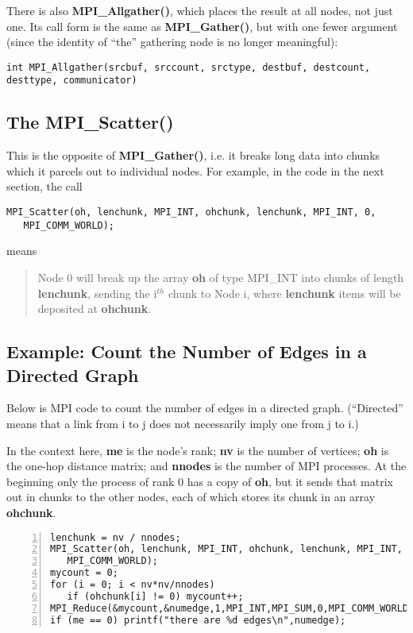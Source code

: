 There is also {\bf MPI\_Allgather()}, which places the result at all
nodes, not just one.  Its call form is the same as {\bf MPI\_Gather()},
but with one fewer argument (since the identity of ``the'' gathering
node is no longer meaningful):

\begin{lstlisting}
int MPI_Allgather(srcbuf, srccount, srctype, destbuf, destcount, desttype, communicator)
\end{lstlisting}

\subsection{The MPI\_Scatter()}

This is the opposite of {\bf MPI\_Gather()}, i.e. it breaks long data
into chunks which it parcels out to individual nodes.  For example,
in the code in the next section, the call

\begin{lstlisting}
MPI_Scatter(oh, lenchunk, MPI_INT, ohchunk, lenchunk, MPI_INT, 0,
   MPI_COMM_WORLD);
\end{lstlisting} 

means

\begin{quote}
Node 0 will break up the array {\bf oh} of type MPI\_INT into chunks 
of length {\bf lenchunk}, sending the i$^{th}$ chunk to Node i, where
{\bf lenchunk} items will be deposited at {\bf ohchunk}.
\end{quote}

\subsection{Example:  Count the Number of Edges in a Directed Graph}

Below is MPI code to count the number of edges in a directed graph.
(``Directed'' means that a link from i to j does not necessarily imply
one from j to i.)  

In the context here, {\bf me} is the node's rank; {\bf nv} is the number
of vertices; {\bf oh} is the one-hop distance matrix; and {\bf nnodes}
is the number of MPI processes.  At the beginning only the process of
rank 0 has a copy of {\bf oh}, but it sends that matrix out in chunks to
the other nodes, each of which stores its chunk in an array {\bf
ohchunk}. 

\begin{lstlisting}[numbers=left]
lenchunk = nv / nnodes;
MPI_Scatter(oh, lenchunk, MPI_INT, ohchunk, lenchunk, MPI_INT, 0,
   MPI_COMM_WORLD);
mycount = 0;
for (i = 0; i < nv*nv/nnodes)
   if (ohchunk[i] != 0) mycount++;
MPI_Reduce(&mycount,&numedge,1,MPI_INT,MPI_SUM,0,MPI_COMM_WORLD);
if (me == 0) printf("there are %d edges\n",numedge);
\end{lstlisting}

